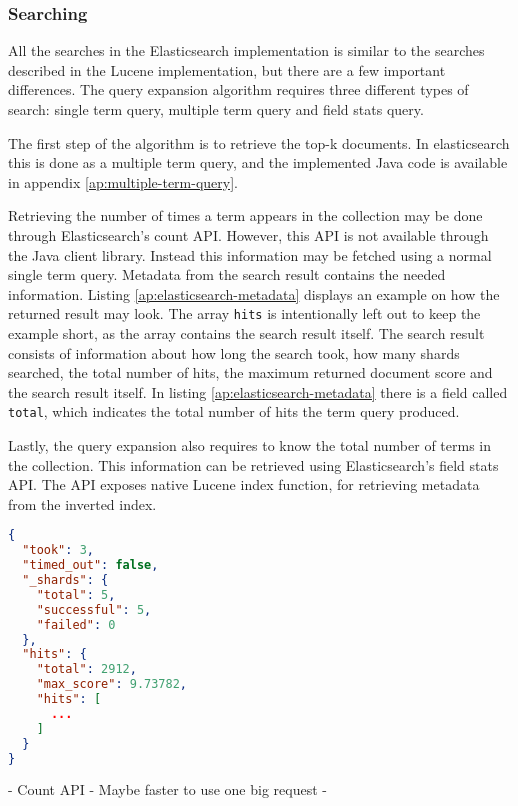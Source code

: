 \subsubsection{Searching}
All the searches in the Elasticsearch implementation is similar to the searches described in the Lucene implementation,
but there are a few important differences.
The query expansion algorithm requires three different types of search:
single term query, multiple term query and field stats query.

The first step of the algorithm is to retrieve the top-k documents.
In elasticsearch this is done as a multiple term query,
and the implemented Java code is available in appendix \ref{ap:multiple-term-query}.

Retrieving the number of times a term appears in the collection may be done through Elasticsearch's count API.
However, this API is not available through the Java client library.
Instead this information may be fetched using a normal single term query.
Metadata from the search result contains the needed information.
Listing \ref{ap:elasticsearch-metadata} displays an example on how the returned result may look.
The array \texttt{hits} is intentionally left out to keep the example short,
as the array contains the search result itself.
The search result consists of information about how long the search took, how many shards searched, the total number of hits,
the maximum returned document score and the search result itself.
In listing \ref{ap:elasticsearch-metadata} there is a field called \texttt{total},
which indicates the total number of hits the term query produced.

Lastly, the query expansion also requires to know the total number of terms in the collection.
This information can be retrieved using Elasticsearch's field stats API.
The API exposes native Lucene index function,
for retrieving metadata from the inverted index.

\begin{lstlisting}[language={json}, caption={Example of the metadata returned by Elasticsearch.}, label={ap:elasticsearch-metadata}]
{
  "took": 3,
  "timed_out": false,
  "_shards": {
    "total": 5,
    "successful": 5,
    "failed": 0
  },
  "hits": {
    "total": 2912,
    "max_score": 9.73782,
    "hits": [
      ...
    ]
  }
}
\end{lstlisting}

- Count API
- Maybe faster to use one big request
-
